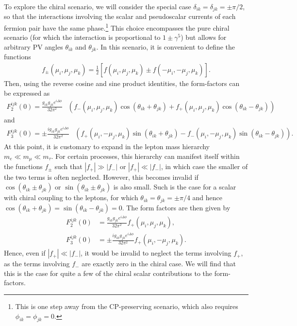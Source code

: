 To explore the chiral scenario, we will consider the special case $\delta_{ik} = \delta_{jk} = \pm\pi/2$, so that the interactions involving the scalar and pseudoscalar currents of each fermion pair have the same phase.\footnote{This is one step away from the CP-preserving scenario, which also requires $\phi_{ik} = \phi_{jk} = 0$.}  This choice encompasses the pure chiral scenario (for which the interaction is proportional to $1 \pm \gamma^5$) but allows for arbitrary PV angles $\theta_{ik}$ and $\theta_{jk}$. In this scenario, it is convenient to define the functions
\begin{align}
    f_{\pm}(\mu_i,\mu_j,\mu_k) = \frac{1}{2}\left[f(\mu_i, \mu_j, \mu_k) \pm f(-\mu_i, -\mu_j, \mu_k)\right].\label{eq:f_plus_minus}
\end{align}
Then, using the reverse cosine and sine product identities, the form-factors can be expressed as
\begin{align}
    F_2^{ijk}(0) = \frac{ g_{ik}g_{jk}e^{i\Delta \phi}}{32\pi^2}&\left(f_-(\mu_i, \mu_j, \mu_k)\cos{(\theta_{ik}+\theta_{jk})}+f_+(\mu_i, \mu_j, \mu_k)\cos{(\theta_{ik}-\theta_{jk})}\right)
\end{align}
and
\begin{align}
    F_3^{ijk}(0) = \pm\frac{ig_{ik}g_{jk}e^{i\Delta \phi}}{32\pi^2}&\left(f_+(\mu_i, -\mu_j, \mu_k)\sin{(\theta_{ik}+\theta_{jk})}-f_-(\mu_i, -\mu_j, \mu_k)\sin{(\theta_{ik}-\theta_{jk})}\right).
\end{align}
At this point, it is customary to expand in the lepton mass hierarchy $m_e \ll m_\mu \ll m_\tau$. For certain processes, this hierarchy can manifest itself within the functions $f_{\pm}$ such that $|f_+| \gg |f_-|$ or $|f_+| \ll |f_-|$, in which case the smaller of the two terms is often neglected. However, this becomes invalid if $\cos{(\theta_{ik}\pm \theta_{jk})}$ or $\sin{(\theta_{ik}\pm \theta_{jk})}$ is also small. Such is the case for a scalar with chiral coupling to the leptons, for which
 $\theta_{ik} = \theta_{jk} = \pm \pi/4$ and hence $\cos(\theta_{ik} + \theta_{jk}) = \sin(\theta_{ik}-\theta_{jk}) = 0$. The form factors are then given by 
\begin{align}
    F_2^{ijk}(0) &= \frac{ g_{ik}g_{jk}e^{i\Delta \phi}}{32\pi^2}f_+(\mu_i, \mu_j, \mu_k),\\
    F_3^{ijk}(0) &= \pm\frac{i g_{ik}g_{jk}e^{i\Delta \phi}}{32\pi^2}f_+(\mu_i, -\mu_j, \mu_k).
\end{align}
Hence, even if $|f_+| \ll |f_-|$, it would be invalid to neglect the terms involving $f_+$, as the terms involving $f_-$ are exactly zero in the chiral case. We will find that this is the case for quite a few of the chiral scalar contributions to the form-factors.

